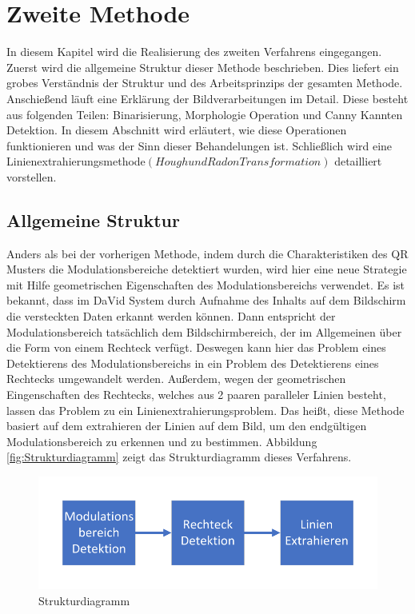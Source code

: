 \chapter{Zweite Methode} \label{cha:ZweiteMethode}

In diesem Kapitel wird die Realisierung des zweiten Verfahrens eingegangen. Zuerst wird die allgemeine Struktur dieser Methode beschrieben. Dies liefert ein grobes Verständnis der Struktur und des Arbeitsprinzips der gesamten Methode. Anschießend läuft eine Erklärung der Bildverarbeitungen im Detail. Diese besteht aus folgenden Teilen: Binarisierung, Morphologie Operation und Canny Kannten Detektion. In diesem Abschnitt wird erläutert, wie diese Operationen funktionieren und was der Sinn dieser Behandelungen ist. Schließlich wird eine Linienextrahierungsmethode$ (Hough und Radon Transformation) $ detailliert vorstellen. 

\section{Allgemeine Struktur} 

Anders als bei der vorherigen Methode, indem durch die  Charakteristiken des QR Musters die Modulationsbereiche detektiert wurden, wird hier eine neue Strategie mit Hilfe geometrischen Eigenschaften des Modulationsbereichs verwendet. Es ist bekannt, dass im DaVid System durch Aufnahme des Inhalts auf dem Bildschirm die versteckten Daten erkannt werden können. Dann entspricht der Modulationsbereich tatsächlich dem Bildschirmbereich, der im Allgemeinen über die Form von einem Rechteck verfügt. Deswegen kann hier das Problem eines Detektierens des Modulationsbereichs in ein Problem des Detektierens eines Rechtecks umgewandelt werden. Außerdem, wegen der geometrischen Eingenschaften des Rechtecks, welches aus 2 paaren paralleler Linien besteht, lassen das Problem zu ein Linienextrahierungsproblem. Das heißt, diese Methode basiert auf dem extrahieren der Linien auf dem Bild, um den endgültigen Modulationsbereich zu erkennen und zu bestimmen. Abbildung \ref{fig:Strukturdiagramm} zeigt das Strukturdiagramm dieses Verfahrens.

\begin{figure}[H]
 \centering 
 \includegraphics[keepaspectratio,width=1.0\textwidth]{images/4_ZweiteErfahrung/Strukturdiagramm.pdf}
 \caption{Strukturdiagramm}
 \label{fig:Strukturdiagramm für zweite Methode}
\end{figure}


